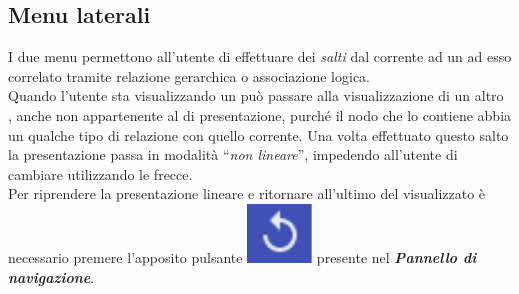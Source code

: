 \subsection{Menu laterali}
I due menu permettono all'utente di effettuare dei \textit{salti} dal  corrente ad un  ad esso correlato tramite relazione gerarchica o associazione logica.\\
Quando l'utente sta visualizzando un \textit{} può passare alla visualizzazione di un altro \textit{}, anche non appartenente al  di presentazione, purché il nodo che lo contiene abbia un qualche tipo di relazione con quello corrente.
Una volta effettuato questo salto la presentazione passa in modalità ``\textit{non lineare}'', impedendo all'utente di cambiare  utilizzando le frecce.\\
Per riprendere la presentazione lineare e ritornare all'ultimo  del  visualizzato è necessario premere l'apposito pulsante \includegraphics[scale=0.5]{immagini/frecciaRicurva.pdf} presente nel \textbf{\textit{Pannello di navigazione}}.
